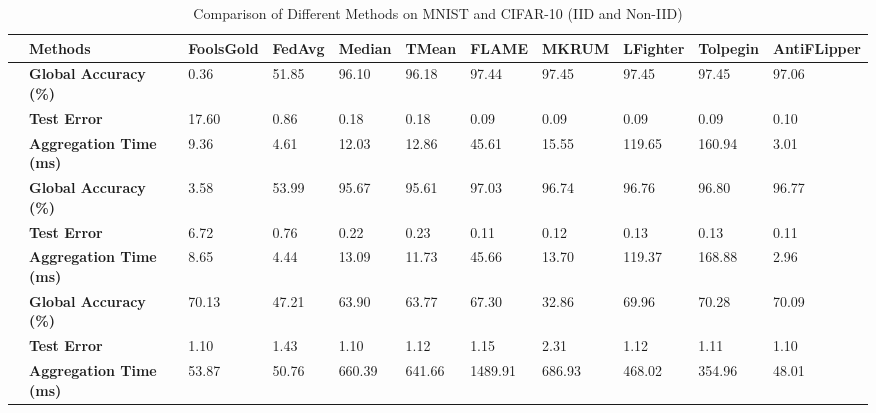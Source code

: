 \documentclass[conference]{IEEEtran}
\begin{document}
\begin{table}[tbh!] 
\centering 
\caption{\small Comparison of Different Methods on MNIST and CIFAR-10 (IID and Non-IID)} 
\renewcommand{\arraystretch}{1.2}
\scriptsize
\begin{tabular}{|c||p{3cm}||p{1.2cm}|p{1cm}|p{1cm}|p{1cm}|p{1cm}|p{1cm}|p{1cm}|p{1cm}|p{1.2cm}|} 
\hline
& \textbf{Methods} & \textbf{FoolsGold} & \textbf{FedAvg} & \textbf{Median} & \textbf{TMean} & \textbf{FLAME} & \textbf{MKRUM} & \textbf{LFighter} & \textbf{Tolpegin} & \textbf{AntiFLipper} \\
\hline\hline

& \textbf{Global Accuracy (\%)}   & 0.36  & 51.85 & 96.10 & 96.18 & 97.44 & 97.45 & 97.45  & 97.45  & 97.06  \\ 
& \textbf{Test Error}             & 17.60 & 0.86  & 0.18  & 0.18  & 0.09  & 0.09  & 0.09   & 0.09   & 0.10   \\ 
& \textbf{Aggregation Time (ms)} & 9.36  & 4.61  & 12.03 & 12.86 & 45.61 & 15.55 & 119.65 & 160.94 & 3.01   \\ 
\hline\hline

& \textbf{Global Accuracy (\%)}   & 3.58  & 53.99 & 95.67 & 95.61 & 97.03 & 96.74 & 96.76  & 96.80  & 96.77  \\ 
& \textbf{Test Error}             & 6.72  & 0.76  & 0.22  & 0.23  & 0.11  & 0.12  & 0.13   & 0.13   & 0.11   \\ 
& \textbf{Aggregation Time (ms)} & 8.65  & 4.44  & 13.09 & 11.73 & 45.66 & 13.70 & 119.37 & 168.88 & 2.96   \\ 
\hline\hline

& \textbf{Global Accuracy (\%)}   & 70.13 & 47.21 & 63.90 & 63.77 & 67.30 & 32.86 & 69.96  & 70.28  & 70.09  \\ 
& \textbf{Test Error}             & 1.10  & 1.43  & 1.10  & 1.12  & 1.15  & 2.31  & 1.12   & 1.11   & 1.10   \\ 
& \textbf{Aggregation Time (ms)} & 53.87 & 50.76 & 660.39 & 641.66 & 1489.91 & 686.93 & 468.02 & 354.96 & 48.01 \\ 
\hline\hline


\end{tabular}
\end{table}
\end{document}
